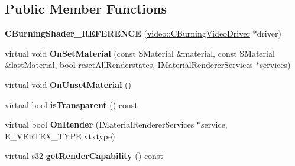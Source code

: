 \subsection*{Public Member Functions}
\begin{DoxyCompactItemize}
\item 
\hypertarget{classirr_1_1video_1_1_c_burning_shader___r_e_f_e_r_e_n_c_e_a196675edc884898a414c78b9f52ffd58}{{\bfseries C\-Burning\-Shader\-\_\-\-R\-E\-F\-E\-R\-E\-N\-C\-E} (\hyperlink{classirr_1_1video_1_1_c_burning_video_driver}{video\-::\-C\-Burning\-Video\-Driver} $\ast$driver)}\label{classirr_1_1video_1_1_c_burning_shader___r_e_f_e_r_e_n_c_e_a196675edc884898a414c78b9f52ffd58}

\item 
\hypertarget{classirr_1_1video_1_1_c_burning_shader___r_e_f_e_r_e_n_c_e_a332db8819fc7cfd6caee3528ffda8e74}{virtual void {\bfseries On\-Set\-Material} (const S\-Material \&material, const S\-Material \&last\-Material, bool reset\-All\-Renderstates, I\-Material\-Renderer\-Services $\ast$services)}\label{classirr_1_1video_1_1_c_burning_shader___r_e_f_e_r_e_n_c_e_a332db8819fc7cfd6caee3528ffda8e74}

\item 
\hypertarget{classirr_1_1video_1_1_c_burning_shader___r_e_f_e_r_e_n_c_e_a83aa60668c8409edc99a0bcc3553c7bf}{virtual void {\bfseries On\-Unset\-Material} ()}\label{classirr_1_1video_1_1_c_burning_shader___r_e_f_e_r_e_n_c_e_a83aa60668c8409edc99a0bcc3553c7bf}

\item 
\hypertarget{classirr_1_1video_1_1_c_burning_shader___r_e_f_e_r_e_n_c_e_af1307e0735cbe248764fedbaa11ab6ba}{virtual bool {\bfseries is\-Transparent} () const }\label{classirr_1_1video_1_1_c_burning_shader___r_e_f_e_r_e_n_c_e_af1307e0735cbe248764fedbaa11ab6ba}

\item 
\hypertarget{classirr_1_1video_1_1_c_burning_shader___r_e_f_e_r_e_n_c_e_a43704659afdacda2536d41d5a310b100}{virtual bool {\bfseries On\-Render} (I\-Material\-Renderer\-Services $\ast$service, E\-\_\-\-V\-E\-R\-T\-E\-X\-\_\-\-T\-Y\-P\-E vtxtype)}\label{classirr_1_1video_1_1_c_burning_shader___r_e_f_e_r_e_n_c_e_a43704659afdacda2536d41d5a310b100}

\item 
\hypertarget{classirr_1_1video_1_1_c_burning_shader___r_e_f_e_r_e_n_c_e_aeb749bbfee7eb4ba049a48a68379dd7a}{virtual s32 {\bfseries get\-Render\-Capability} () const }\label{classirr_1_1video_1_1_c_burning_shader___r_e_f_e_r_e_n_c_e_aeb749bbfee7eb4ba049a48a68379dd7a}

\end{DoxyCompactItemize}

